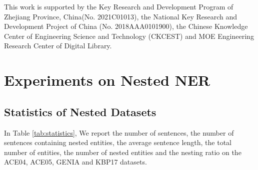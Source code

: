 \documentclass[11pt,a4paper]{article}
\begin{document}
This work is supported by the Key Research and Development Program of Zhejiang Province, China(No. 2021C01013), the National Key Research and Development Project of China (No. 2018AAA0101900), the Chinese Knowledge Center of Engineering Science and Technology (CKCEST) and MOE Engineering Research Center of Digital Library.




























































\clearpage
\newpage

\appendix


\section{Experiments on Nested NER}

\label{app:nestedner}
\subsection{Statistics of Nested Datasets}
\label{app:statistic}
In Table \ref{tab:statistics}, We report the number of sentences, the number of sentences containing nested entities, the average sentence length, the total number of entities, the number of nested entities and the nesting ratio on the ACE04, ACE05, GENIA and KBP17 datasets.
\end{document}
